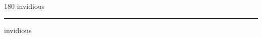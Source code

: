 
\begin{frame}
\begin{center}
\begin{turn}{180}
{\fontsize{2.5cm}{1em}\selectfont invidious}
\end{turn}
\vspace{1em}\par  
\hrule
\vspace{1em}\par  
{\fontsize{2.5cm}{1em}\selectfont invidious}
\end{center}
\end{frame}
